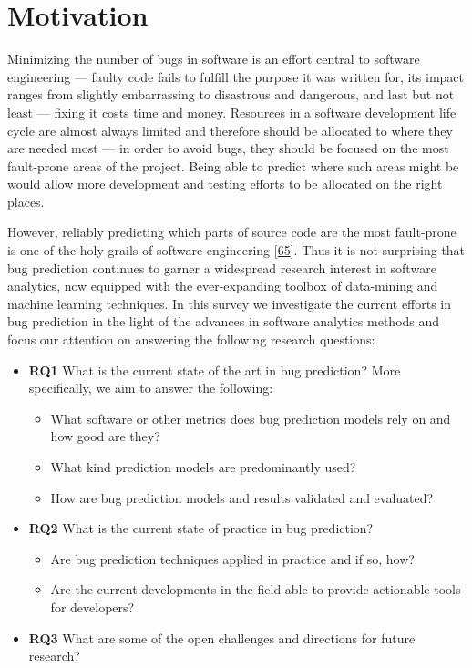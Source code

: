 \documentclass[]{book}
\providecommand{\tightlist}{%
  \setlength{\itemsep}{0pt}\setlength{\parskip}{0pt}}
\begin{document}
\section{Motivation}\label{motivation-2}

Minimizing the number of bugs in software is an effort central to
software engineering --- faulty code fails to fulfill the purpose it was
written for, its impact ranges from slightly embarrassing to disastrous
and dangerous, and last but not least --- fixing it costs time and
money. Resources in a software development life cycle are almost always
limited and therefore should be allocated to where they are needed most
--- in order to avoid bugs, they should be focused on the most
fault-prone areas of the project. Being able to predict where such areas
might be would allow more development and testing efforts to be
allocated on the right places.

However, reliably predicting which parts of source code are the most
fault-prone is one of the holy grails of software engineering
{[}\protect\hyperlink{ref-DAmbros2012}{65}{]}. Thus it is not surprising
that bug prediction continues to garner a widespread research interest
in software analytics, now equipped with the ever-expanding toolbox of
data-mining and machine learning techniques. In this survey we
investigate the current efforts in bug prediction in the light of the
advances in software analytics methods and focus our attention on
answering the following research questions:

\begin{itemize}
\tightlist
\item
  \textbf{RQ1} What is the current state of the art in bug prediction?
  More specifically, we aim to answer the following:

  \begin{itemize}
  \tightlist
  \item
    What software or other metrics does bug prediction models rely on
    and how good are they?
  \item
    What kind prediction models are predominantly used?
  \item
    How are bug prediction models and results validated and evaluated?
  \end{itemize}
\item
  \textbf{RQ2} What is the current state of practice in bug prediction?

  \begin{itemize}
  \tightlist
  \item
    Are bug prediction techniques applied in practice and if so, how?
  \item
    Are the current developments in the field able to provide actionable
    tools for developers?
  \end{itemize}
\item
  \textbf{RQ3} What are some of the open challenges and directions for
  future research?
\end{itemize}
\end{document}
